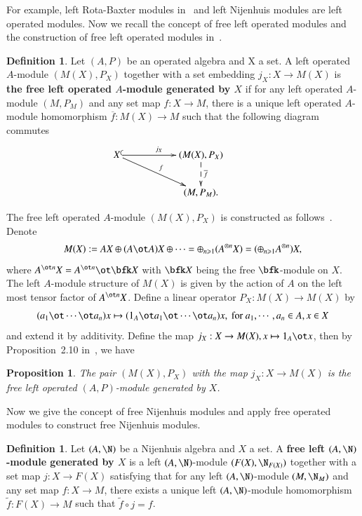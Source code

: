 \documentclass[12pt]{amsart}
\newtheorem{prop}[theorem]{Proposition}
\theoremstyle{definition}
\newtheorem{defn}[theorem]{Definition}
\renewcommand\geq{\geqslant}
\begin{document}
For example, left Rota-Baxter modules in~ and left Nijenhuis modules are left operated modules. Now we recall the concept of free left operated modules and the construction of free left operated modules in~.

\begin{defn}
Let $(A,P)$ be an operated algebra and X a set. A left operated $A$-module $(M(X), P_X)$ together with a set embedding $j_X: X \to M(X)$ is {\bf the free left operated $A$-module generated by $X$} if for any left operated $A$-module $(M,P_M)$ and any set map $f:X \to M$, there is a unique left operated $A$-module homomorphism $\overline{f}: M(X) \to M$ such that the following diagram commutes  
$$
\xymatrix{
X\ar@{^{(}->}[rr]^{j_X} \ar^{f}[drr]&&(M(X),P_X)\ar@{-->}^{\overline{f}}[d]&\\
&&(M,P_M). }
$$
\end{defn}

 
The free left operated $A$-module $(M(X),P_X)$ is constructed as follows~. Denote
\begin{align*}
M(X):= AX \oplus (A\ot A)X \oplus \cdots = \oplus_{n\geq 1}(A^{\otimes n}X)= (\oplus_{n\geq 1}A^{\otimes n})X,
\end{align*}
where $A^{\ot n}X=A^{\ot n}\ot \bfk X$ with $\bfk X$ being the free $\bfk$-module on $X$. The left $A$-module structure of $M(X)$ is given by the action of $A$ on the left most tensor factor of $A^{\ot n}X$. Define a linear operator $P_X: M(X)\to M(X)$ by 
$$(a_1\ot \cdots \ot a_n)x\mapsto (1_A\ot a_1\ot \cdots \ot a_n) x, \ \text{for }  a_1, \cdots, a_n\in A, x\in X$$
and extend it by additivity. Define the map $j_X: X \to M(X), x \mapsto 1_A \ot x$, then by Proposition~2.10 in~, we have
\begin{prop}
The pair $(M(X),P_X)$ with the map $j_X: X \to M(X)$ is the free left operated $(A,P)$-module generated by $X$. 
\end{prop}

Now we give the concept of free Nijenhuis modules and apply free operated modules to construct free Nijenhuis modules.

\begin{defn}
Let $(A,\N)$ be a Nijenhuis algebra and $X$ a set. A {\bf free left $(A,\N)$-module generated by $X$} is a left $(A,\N)$-module $(F(X),\N_{F(X)})$ together with a set map $j: X \to F(X)$
satisfying that for any left $(A,\N)$-module $(M,\N_M)$ and any set map $f: X \to M$, there exists a unique
left $(A,\N)$-module homomorphism $\widetilde{f}: F(X) \to M$ such that $\widetilde{f} \circ j= f$.
\end{defn}
\end{document}
